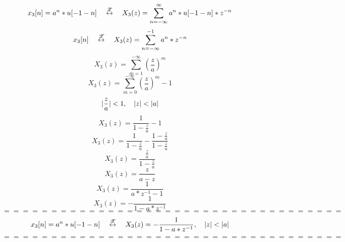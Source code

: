 \begin{Udledninger}
\begin{underrubrik}
    \end{underrubrik}
    \begin{underrubrik}
        \[x_3[n] = a^n*u[-1-n] \quad\overset{\mathscr{Z}}{\leftrightarrow}\quad X_3(z) = \sum_{n=-\infty}^{\infty}     {a^n*u[-1-n]*z^{-n}}\]
        \[x_3[n] \quad\overset{\mathscr{Z}}{\leftrightarrow}\quad X_3(z) = \sum_{n=-\infty}^{-1}                               {a^n*z^{-n}}\]
        \[X_3(z) = \sum_{m = 1}^{-\infty}                                                   {(\frac{z}{a})^m}\]
        \[X_3(z) = \sum_{m = 0}^{-\infty}                                               {(\frac{z}{a})^m} - 1\]
        \[|\frac{z}{a}|<1, \tab |z|<|a|\]
        \[X_3(z) = \frac{1}{1 - \frac{z}{a}} - 1\]
        \[X_3(z) = \frac{1}{1 - \frac{z}{a}} - \frac{1 - \frac{z}{a}}{1 - \frac{z}{a}}\]
        \[X_3(z) = \frac{\frac{z}{a}}{1 - \frac{z}{a}}\]
        \[X_3(z) = \frac{z}{a - z}\]
        \[X_3(z) = \frac{1}{a*z^{-1} - 1}\]
        \[X_3(z) = - \frac{1}{1 - a*z^{-1}}\]
        \[====================================\]
        \[x_3[n] = a^n*u[-1-n] \transformation{Z} X_3(z) = - \frac{1}{1 - a*z^{-1}}, \tab |z|<|a|\]
        \[====================================\]
    \end{underrubrik} 
\end{Udledninger}